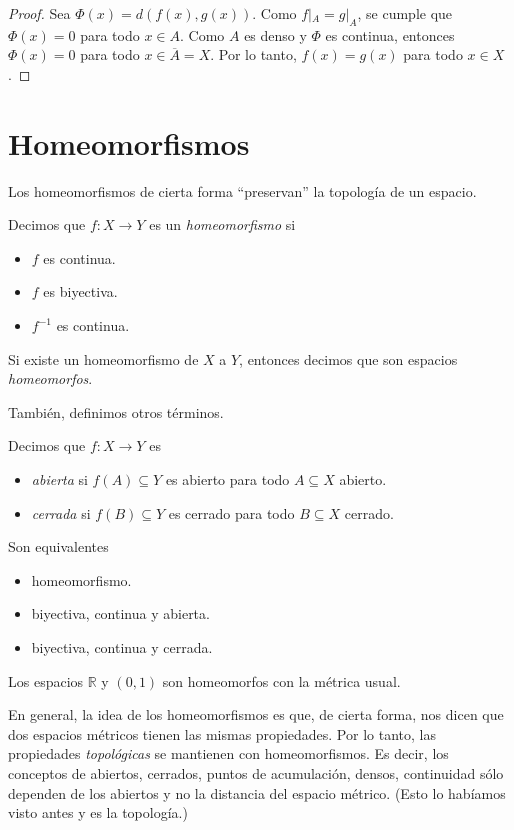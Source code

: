 \begin{proof}
	Sea $\Phi(x) = d(f(x), g(x))$. Como $f|_A = g|_A$, se cumple que $\Phi(x) = 0$ para todo $x \in A$. Como $A$ es denso y $\Phi$ es continua, entonces $\Phi(x) = 0$ para todo $x \in \overline{A} = X$. Por lo tanto, $f(x) = g(x)$ para todo $x \in X$.
\end{proof}


\section{Homeomorfismos}

Los homeomorfismos de cierta forma ``preservan'' la topología de un espacio.

\begin{definition}
	Decimos que $f : X \to Y$ es un \emph{homeomorfismo} si
	\begin{itemize}
		\item $f$ es continua.
		\item $f$ es biyectiva.
		\item $f^{-1}$ es continua.
	\end{itemize}
	Si existe un homeomorfismo de $X$ a $Y$, entonces decimos que son espacios \emph{homeomorfos}.
\end{definition}

También, definimos otros términos.

\begin{definition}
	Decimos que $f : X \to Y$ es
	\begin{itemize}
		\item \emph{abierta} si $f(A) \subseteq Y$ es abierto para todo $A \subseteq X$ abierto.
		\item \emph{cerrada} si $f(B) \subseteq Y$ es cerrado para todo $B \subseteq X$ cerrado.
	\end{itemize}
\end{definition}

\begin{remark}
	Son equivalentes
	\begin{itemize}
		\item homeomorfismo.
		\item biyectiva, continua y abierta.
		\item biyectiva, continua y cerrada.
	\end{itemize}
\end{remark}

\begin{example}
	Los espacios $\mathbb{R}$ y $(0, 1)$ son homeomorfos con la métrica usual.
\end{example}

En general, la idea de los homeomorfismos es que, de cierta forma, nos dicen que dos espacios métricos tienen las mismas propiedades. Por lo tanto, las propiedades \textit{topológicas} se mantienen con homeomorfismos. Es decir, los conceptos de abiertos, cerrados, puntos de acumulación, densos, continuidad sólo dependen de los abiertos y no la distancia del espacio métrico. (Esto lo habíamos visto antes y es la topología.)




